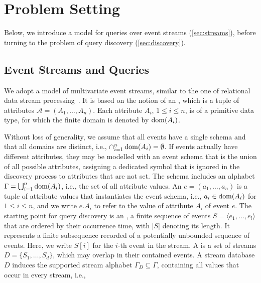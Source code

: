 \section{Problem Setting}
\label{sec:problem}

Below, we
introduce a model for queries over event streams
(\autoref{sec:streams}),
before turning to the problem of query discovery
(\autoref{sec:discovery}).



\subsection{Event Streams and Queries}
\label{sec:streams}


We adopt a model of multivariate event streams, similar to the one
of relational data stream
processing~\cite{DBLP:journals/vldb/ArasuBW06}. It is
based on the
notion of an , which is a tuple of
attributes
$\mathcal{A}= (A_1, \ldots, A_n)$. Each attribute $A_i$, $1\leq i\leq
n$, is of a primitive data type, for which the finite domain is denoted by
$\operatorname{dom}(A_i)$.

Without loss of generality, we assume that all events have a single schema
and that all domains
are distinct, i.e., $\cap_{i=1}^n \operatorname{dom}(A_i) =
\emptyset$. If events actually have different
attributes, they may
be modelled with an event
schema that is the union of all possible attributes, assigning a dedicated
symbol that is ignored in the discovery process to attributes that are not
set.
The schema includes an alphabet $\Gamma =
\bigcup_{i=1}^n{\operatorname{dom}(A_i)}$, i.e.,
the set of all attribute values.
An  $e=(a_1, \ldots, a_n)$ is a tuple of
attribute
values that instantiates the event schema, i.e., $a_i\in \operatorname{dom}(A_i)$ for $1\leq
i\leq n$, and we write
$e.A_i$ to refer to the value of attribute $A_i$ of event $e$.
The starting point for query discovery is an , a finite
sequence of events $S=\langle e_1, \ldots, e_l
\rangle$ {that are ordered by their occurrence time,
with $|S|$
denoting its length. It represents a
finite subsequence recorded of a
potentially unbounded sequence of events.}
Here, we write $S[i]$ for the $i$-th
event in the stream. A  is a set
of
streams $D=\{S_1,\ldots, S_d\}$, which may overlap in their contained events.
A stream database $D$ induces the supported stream alphabet
$\Gamma_D \subseteq \Gamma$, containing all values that occur in every stream,
i.e.,

